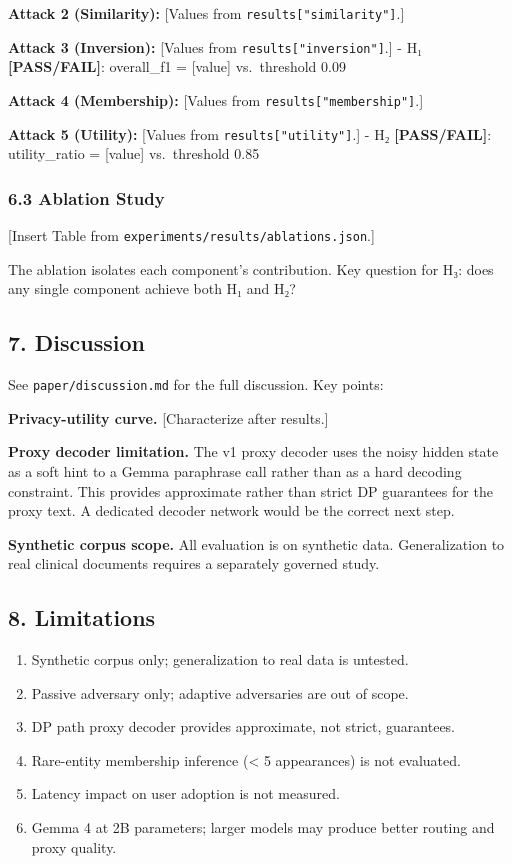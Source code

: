 \textbf{Attack 2 (Similarity):} {[}Values from
\texttt{results{[}"similarity"{]}}.{]}

\textbf{Attack 3 (Inversion):} {[}Values from
\texttt{results{[}"inversion"{]}}.{]} - H₁ \textbf{{[}PASS/FAIL{]}}:
overall\_f1 = {[}value{]} vs.~threshold 0.09

\textbf{Attack 4 (Membership):} {[}Values from
\texttt{results{[}"membership"{]}}.{]}

\textbf{Attack 5 (Utility):} {[}Values from
\texttt{results{[}"utility"{]}}.{]} - H₂ \textbf{{[}PASS/FAIL{]}}:
utility\_ratio = {[}value{]} vs.~threshold 0.85

\subsubsection{6.3 Ablation Study}\label{ablation-study}

{[}Insert Table from \texttt{experiments/results/ablations.json}.{]}

The ablation isolates each component's contribution. Key question for
H₃: does any single component achieve both H₁ and H₂?

\subsection{7. Discussion}\label{discussion}

See \texttt{paper/discussion.md} for the full discussion. Key points:

\textbf{Privacy-utility curve.} {[}Characterize after results.{]}

\textbf{Proxy decoder limitation.} The v1 proxy decoder uses the noisy
hidden state as a soft hint to a Gemma paraphrase call rather than as a
hard decoding constraint. This provides approximate rather than strict
DP guarantees for the proxy text. A dedicated decoder network would be
the correct next step.

\textbf{Synthetic corpus scope.} All evaluation is on synthetic data.
Generalization to real clinical documents requires a separately governed
study.

\subsection{8. Limitations}\label{limitations}

\begin{enumerate}
\def\labelenumi{\arabic{enumi}.}
\tightlist
\item
  Synthetic corpus only; generalization to real data is untested.
\item
  Passive adversary only; adaptive adversaries are out of scope.
\item
  DP path proxy decoder provides approximate, not strict, guarantees.
\item
  Rare-entity membership inference (\textless{} 5 appearances) is not
  evaluated.
\item
  Latency impact on user adoption is not measured.
\item
  Gemma 4 at 2B parameters; larger models may produce better routing and
  proxy quality.
\end{enumerate}

